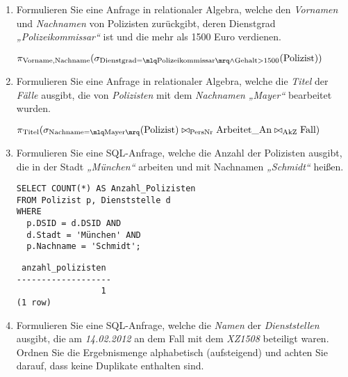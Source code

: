 \documentclass{bschlangaul-aufgabe}
\begin{document}
\begin{enumerate}


\item Formulieren Sie eine Anfrage in relationaler
Algebra, welche den \emph{Vornamen} und
\emph{Nachnamen} von Polizisten zurückgibt, deren Dienstgrad
\emph{„Polizeikommissar“} ist und die mehr als 1500 Euro verdienen.

\begin{bAntwort}
$\pi_{\text{Vorname,Nachname}}(
  \sigma_{
    \text{Dienstgrad} = \mlq \text{Polizeikommissar} \mrq
      \land
    \text{Gehalt} > 1500
  }(\text{Polizist})
)$
\end{bAntwort}


\item Formulieren Sie eine Anfrage in relationaler Algebra, welche die
\emph{Titel} der \emph{Fälle} ausgibt, die von \emph{Polizisten} mit dem
\emph{Nachnamen} \emph{„Mayer“} bearbeitet wurden.

\begin{bAntwort}
$
\pi_{\text{Titel}}(
  \sigma_{\text{Nachname} = \mlq \text{Mayer} \mrq}(\text{Polizist})
  \bowtie_{\text{PersNr}}
  \text{Arbeitet\_An}
  \bowtie_{\text{AkZ}}
  \text{Fall}
)
$
\end{bAntwort}


\item Formulieren Sie eine SQL-Anfrage, welche die Anzahl der
Polizisten ausgibt, die in der Stadt \emph{„München“} arbeiten und mit
Nachnamen \emph{„Schmidt“} heißen.

\begin{bAntwort}
\begin{verbatim}
SELECT COUNT(*) AS Anzahl_Polizisten
FROM Polizist p, Dienststelle d
WHERE
  p.DSID = d.DSID AND
  d.Stadt = 'München' AND
  p.Nachname = 'Schmidt';
\end{verbatim}

\begin{verbatim}
 anzahl_polizisten
-------------------
                 1
(1 row)
\end{verbatim}
\end{bAntwort}


\item Formulieren Sie eine SQL-Anfrage, welche die \emph{Namen} der
\emph{Dienststellen} ausgibt, die am \emph{14.02.2012} an dem Fall mit
dem \emph{XZ1508} beteiligt waren. Ordnen Sie die Ergebnismenge
alphabetisch (aufsteigend) und achten Sie darauf, dass keine Duplikate
enthalten sind.


\end{enumerate}
\end{document}
